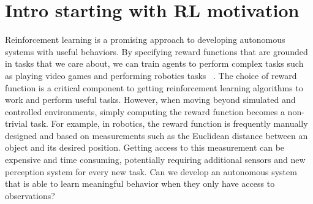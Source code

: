 \section{Intro starting with RL motivation}


Reinforcement learning is a promising approach to developing autonomous systems with useful behaviors.
By specifying reward functions that are grounded in tasks that we care about,
we can train agents to perform complex tasks such as playing video games\cite{mnih2015human, silver2016alphago} and performing robotics tasks ~\cite{something}.
The choice of reward function is a critical component to getting reinforcement learning algorithms to work and perform useful tasks.
However, when moving beyond simulated and controlled environments, simply computing the reward function becomes a non-trivial task.
For example, in robotics, the reward function is frequently manually designed and based on measurements such as the Euclidean distance between an object and its desired position.
Getting access to this measurement can be expensive and time consuming, potentially requiring additional sensors and new perception system for every new task.
Can we develop an autonomous system that is able to learn meaningful behavior when they only have access to observations?


